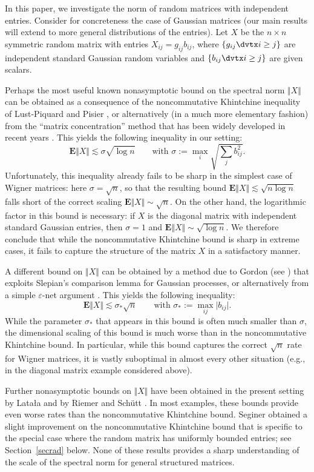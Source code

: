 \documentclass[aop,MSNbibl,dvips]{arximspdf}
\newcommand{\rrvert}{\vert}
\newcommand{\rrVert}{\Vert}
\newcommand{\llvert}{\vert}
\newcommand{\llVert}{\Vert}
\newcommand{\EE}{\mathbf{E}}
\begin{document}
In this paper, we investigate the norm of random matrices with independent
entries. Consider for concreteness the case of Gaussian matrices
(our main results will extend to more general distributions of the
entries). Let $X$ be the $n\times n$ symmetric random matrix with entries
$X_{ij}=g_{ij}b_{ij}$, where $\{g_{ij}\dvtx i\ge j\}$ are independent standard
Gaussian random variables and $\{b_{ij}\dvtx i\ge j\}$ are given scalars.

Perhaps the most useful known nonasymptotic bound on the spectral norm
$\llVert X\rrVert $ can be obtained as a consequence of the
noncommutative Khintchine
inequality of Lust-Piquard and Pisier \cite{Pis03}, or alternatively
(in a much more elementary fashion) from the ``matrix concentration''
method that has been widely developed in recent years \cite{Oli10,Tro12}.
This yields the following inequality in our setting:
%
\[
\EE\llVert X\rrVert\lesssim\sigma\sqrt{\log n} \qquad\mbox{with }
\sigma:=
\max_i\sqrt{\sum_j
b_{ij}^2}. %
\]
%
Unfortunately, this inequality already fails to be sharp in the simplest
case of Wigner matrices: here $\sigma=\sqrt{n}$, so that the resulting
bound $\EE\llVert X\rrVert \lesssim\sqrt{n\log n}$ falls short of the
correct scaling
$\EE\llVert X\rrVert \sim\sqrt{n}$. On the other hand, the
logarithmic factor in this
bound is necessary: if $X$ is the diagonal matrix
with independent standard Gaussian entries, then $\sigma=1$ and
$\EE\llVert X\rrVert \sim\sqrt{\log n}$. We therefore
conclude that while the noncommutative Khintchine bound is sharp in
extreme cases, it fails to capture the structure of the matrix $X$ in a
satisfactory manner.

A different bound on $\llVert X\rrVert $ can be obtained by a method
due to Gordon
(see \cite{DS01}) that exploits Slepian's comparison lemma for Gaussian
processes, or alternatively from a simple $\varepsilon$-net argument
\cite{Ver12,Tao12}. This yields the following inequality:
%
\[
\EE\llVert X\rrVert\lesssim\sigma_*\sqrt{n}\qquad\mbox{with }
\sigma_*:=
\max_{ij}\llvert b_{ij}\rrvert. %
\]
%
While the parameter $\sigma_*$ that appears in this bound is often much
smaller than $\sigma$, the dimensional scaling of this bound is much worse
than in the noncommutative Khintchine bound. In particular, while this
bound captures the correct $\sqrt{n}$ rate for Wigner matrices, it is
vastly suboptimal in almost every other situation (e.g., in the
diagonal matrix example considered above).

Further nonasymptotic bounds on $\llVert X\rrVert $ have been
obtained in the present
setting by Lata{\l}a \cite{Lat05} and by Riemer and Sch\"utt \cite{RS13}.
In most examples, these bounds provide even worse rates than the
noncommutative Khintchine bound. Seginer \cite{Seg00} obtained a slight
improvement on the noncommutative Khintchine bound that is specific to the
special case where the random matrix has uniformly bounded entries; see
Section~\ref{secrad} below. None of these results provides a sharp
understanding of the scale of the spectral norm for general structured
matrices.
\end{document}
